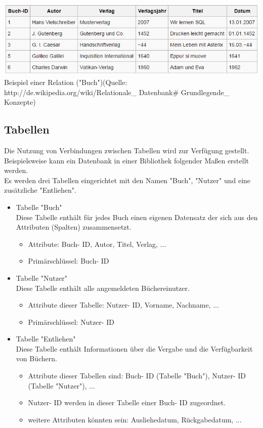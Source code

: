 \documentclass[12pt,a4paper]{report}
\begin{document}
\begin{onehalfspace}
\begin{center}
\includegraphics[scale=0.8]{img/relation_DB.png}\\
Beispiel einer Relation ("{}Buch"{})(Quelle: http://de.wikipedia.org/wiki/Relationale\_ Datenbank\# Grundlegende\_ Konzepte)
\end{center}

\subsection{Tabellen}
Die Nutzung von Verbindungen zwischen Tabellen wird zur Verfügung gestellt. Beispielsweise kann ein Datenbank in einer Bibliothek folgender Maßen erstellt werden.\\

Es werden drei Tabellen eingerichtet mit den Namen "{}Buch"{}, "{}Nutzer"{} und eine zusätzliche "{}Entliehen"{}.
\begin{itemize}
\item Tabelle "{}Buch"{}\\
Diese Tabelle enthält für jedes Buch einen eigenen Datensatz der sich aus den Attributen (Spalten) zusammensetzt.
\begin{itemize}
\item Attribute: Buch- ID, Autor, Titel, Verlag, ...
\item Primärschlüssel: Buch- ID
\end{itemize}
\item Tabelle "{}Nutzer"{}\\
Diese Tabelle enthält alle angemeldeten Büchereinutzer.\\
\begin{itemize}
\item Attribute dieser Tabelle: Nutzer- ID, Vorname, Nachname, ...
\item Primärschlüssel: Nutzer- ID
\end{itemize}
\item Tabelle "{}Entliehen"{}\\
Diese Tabelle enthält Informationen über die Vergabe und die Verfügbarkeit von Büchern.\\
\begin{itemize}
\item Attribute dieser Tabellen sind: Buch- ID (Tabelle "{}Buch"{}), Nutzer- ID (Tabelle "{}Nutzer"{}), ...
\item Nutzer- ID werden in dieser Tabelle einer Buch- ID zugeordnet.
\item weitere Attributen könnten sein: Ausliehedatum, Rückgabedatum, ...
\end{itemize}
\end{itemize}


\end{onehalfspace}
\end{document}
